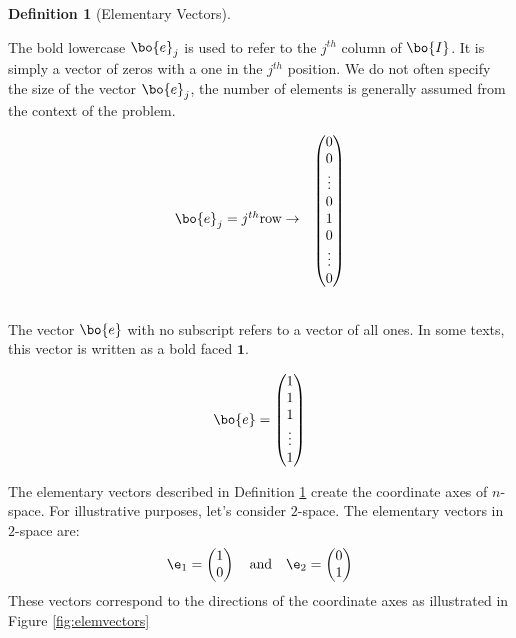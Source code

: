 \documentclass[
]{article}
\theoremstyle{definition}
\newtheorem{definition}{Definition}[section]
\theoremstyle{definition}
\theoremstyle{definition}
\theoremstyle{definition}
\theoremstyle{remark}
\begin{document}
\begin{definition}[Elementary Vectors]
\protect\hypertarget{def:elemvectors}{}\label{def:elemvectors}

The bold lowercase \(\bo{e}_j\) is used to refer to the \(j^{th}\) column of \(\bo{I}\). It is simply a vector of zeros with a one in the \(j^{th}\) position. We do not often specify the size of the vector \(\bo{e}_j\), the number of elements is generally assumed from the context of the problem.

\[\bo{e}_j=\begin{matrix}
\begin{matrix} ~ \\~\\~\\~\\j^{th}\text{row} \rightarrow \\ ~\\~\\~ \end{matrix} & 
  \begin{pmatrix}0\\0\\ \vdots \\0\\1\\0\\ \vdots\\0\end{pmatrix}\\\\
\end{matrix}\]

The vector \(\bo{e}\) with no subscript refers to a vector of all ones. In some texts, this vector is written as a bold faced \(\textbf{1}\).

\[\bo{e} = \left(\begin{matrix} 1\\1\\1\\ \vdots \\ 1\end{matrix}\right)\]

\end{definition}

The elementary vectors described in Definition \ref{def:elemvectors} create the coordinate axes of \(n\)-space. For illustrative purposes, let's consider \(2\)-space. The elementary vectors in \(2\)-space are:
\[\e_1 = \left(\begin{matrix} 1\\0\end{matrix}\right) \quad \mbox{and} \quad \e_2 = \left(\begin{matrix} 0\\1 \end{matrix}\right) \]
These vectors correspond to the directions of the coordinate axes as illustrated in Figure \ref{fig:elemvectors}
\end{document}
